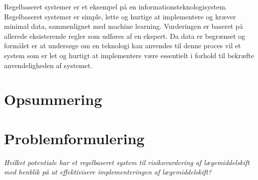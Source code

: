 Regelbaseret systemer er et eksempel på en informationsteknologisystem. Regelbaseret systemer er simple, lette og hurtige at implementere og kræver minimal data, sammenlignet med machine learning. Vurderingen er baseret på allerede eksisterende regler som udføres af en ekspert. Da data er begrænset og formålet er at undersøge om en teknologi kan anvendes til denne proces vil et system som er let og hurtigt at implementere være essentielt i forhold til bekræfte anvendeligheden af systemet. 



\section{Opsummering}

\section{Problemformulering}



\textit{Hvilket potentiale har et regelbaseret system til risikovurdering af lægemiddelskift med henblik på at effektivisere implementeringen af lægemiddelskift?} 


